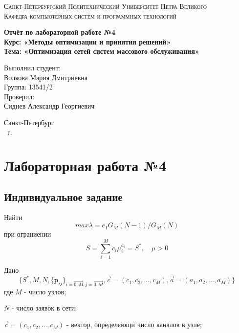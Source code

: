 \documentclass[14pt,a4paper,report]{report}
\begin{document}
\def\contentsname{Содержание}

\begin{titlepage}
	\begin{center}
		\textsc{Санкт-Петербургский Политехнический 
			Университет Петра Великого\\[5mm]
			Кафедра компьютерных систем и программных технологий}
		
		\vfill
		
		\textbf{Отчёт по лабораторной работе №4\\[3mm]
			Курс: «Методы оптимизации и принятия решений»\\[3mm]
			Тема: «Оптимизация сетей систем массового обслуживания»\\[35mm]
			}
	\end{center}
	
	\hfill
	\begin{minipage}{.5\textwidth}
		Выполнил студент:\\[2mm] 
		Волкова Мария Дмитриевна\\
		Группа: 13541/2\\[5mm]
		
		Проверил:\\[2mm] 
		Сиднев Александр Георгиевич
	\end{minipage}
	\vfill
	\begin{center}
		Санкт-Петербург\\ \the\year\ г.
	\end{center}
\end{titlepage}

\tableofcontents
\clearpage

\chapter{Лабораторная работа №4}

\section{Индивидуальное задание}
Найти
$$ max \lambda = e_1G_M(N-1)/G_M(N) $$
при ограниении
$$ S =\sum_{i=1}^M c_i \mu_i^{a_i} = S^ *,\quad \mu>0$$

Дано
$$ \{S^ *, M, N, \{\textbf{p}_{ij} \}_{i=\overrightarrow{0,M}, j=\overrightarrow{0,M}} , \vec{c}=(c_1, c_2, ... , c_M) , \vec{a}=(a_1, a_2, ... , a_M) \} $$
где 
$M$ - число узлов;

$N$ - число заявок в сети;

$\vec{c}=(c_1, c_2, ... , c_M)$ - вектор, определяющи число каналов в узле;
\end{document}
